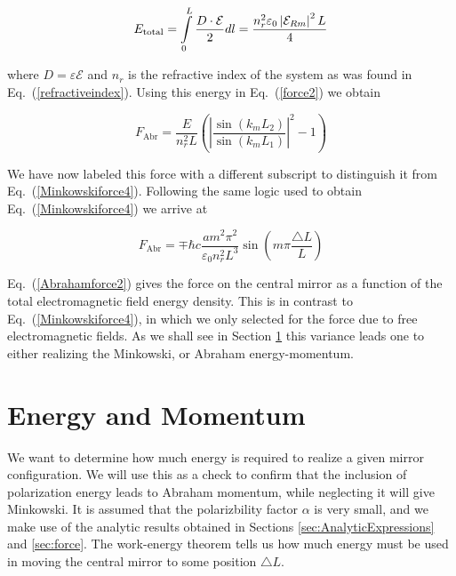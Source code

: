 \documentclass[twocolumn,english,pra,aps,superscriptaddress,floatfix]{revtex4-1}
\begin{document}
\begin{equation}
E_{\mathrm{total}}=\intop_{0}^{L}\frac{D\cdot \mathcal{E}}{2}dl=\frac{n_{r}^{2}\varepsilon_{0}\left| \mathcal{E}_{Rm}\right|^{2}L}{4}
\label{energydensity2}
\end{equation}

where $D=\varepsilon \mathcal{E}$ and $n_{r}$ is the refractive index of the system as was found in Eq.\ (\ref{refractiveindex}).
Using this energy in Eq.\ (\ref{force2}) we obtain

\begin{equation}
F_{\mathrm{Abr}}=\frac{E}{n_{r}^{2}L}\left(\left|\frac{\sin(k_{m}L_{2})}{\sin(k_{m}L_{1})}\right|^{2}-1\right)
\label{Abrahamforce1}
\end{equation}

We have now labeled this force with a different subscript to distinguish it from Eq.\ (\ref{Minkowskiforce4}).  
Following the same logic used to obtain Eq.\ (\ref{Minkowskiforce4}) we arrive at 

\begin{equation}
F_{\mathrm{Abr}}=\mp\hbar c\frac{a m^{2}\pi^{2}}{\varepsilon_{0}n_{r}^{2}L^{3}}\sin(m\pi\frac{\triangle L}{L})
\label{Abrahamforce2}
\end{equation}

Eq.\ (\ref{Abrahamforce2}) gives the force on the central mirror as a function of the total electromagnetic field energy density.  This is in contrast to Eq.\ (\ref{Minkowskiforce4}), in which we only selected for the force due to free electromagnetic fields.  As we shall see in Section \ref{sec:Energy} this variance leads one to either realizing the Minkowski, or Abraham energy-momentum.  



\section{Energy and Momentum}
\label{sec:Energy}

We want to determine how much energy is required to realize a given mirror configuration.  We will use this as a check to confirm that the inclusion of polarization energy leads to Abraham momentum, while neglecting it will give Minkowski. It is assumed that the polarizbility factor $\alpha$ is very small, and we make use of the analytic results obtained in Sections \ref{sec:AnalyticExpressions} and \ref{sec:force}. The work-energy theorem tells us how much energy must be used in moving the central mirror to some position $\triangle L$.
\end{document}
